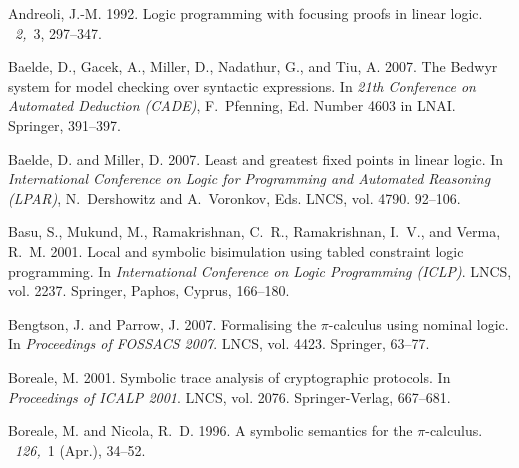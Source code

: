 \documentclass{acmtrans2m}
\begin{document}
\begin{thebibliography}{}

{\sc Andreoli, J.-M.} 1992.
\newblock Logic programming with focusing proofs in linear logic.
~{\em 2,\/}~3, 297--347.

{\sc Baelde, D.}, {\sc Gacek, A.}, {\sc Miller, D.}, {\sc Nadathur, G.}, {\sc
  and} {\sc Tiu, A.} 2007.
\newblock The {Bedwyr} system for model checking over syntactic expressions.
\newblock In {\em 21th Conference on Automated Deduction (CADE)},
  {F.~Pfenning}, Ed. Number 4603 in LNAI. Springer, 391--397.

{\sc Baelde, D.} {\sc and} {\sc Miller, D.} 2007.
\newblock Least and greatest fixed points in linear logic.
\newblock In {\em International Conference on Logic for Programming and
  Automated Reasoning (LPAR)}, {N.~Dershowitz} {and} {A.~Voronkov}, Eds. LNCS,
  vol. 4790. 92--106.

{\sc Basu, S.}, {\sc Mukund, M.}, {\sc Ramakrishnan, C.~R.}, {\sc Ramakrishnan,
  I.~V.}, {\sc and} {\sc Verma, R.~M.} 2001.
\newblock Local and symbolic bisimulation using tabled constraint logic
  programming.
\newblock In {\em International Conference on Logic Programming ({ICLP})}.
  LNCS, vol. 2237. Springer, Paphos, Cyprus, 166--180.

{\sc Bengtson, J.} {\sc and} {\sc Parrow, J.} 2007.
\newblock Formalising the $\pi$-calculus using nominal logic.
\newblock In {\em Proceedings of FOSSACS 2007}. LNCS, vol. 4423. Springer,
  63--77.

{\sc Boreale, M.} 2001.
\newblock Symbolic trace analysis of cryptographic protocols.
\newblock In {\em Proceedings of ICALP 2001}. LNCS, vol. 2076. Springer-Verlag,
  667--681.

{\sc Boreale, M.} {\sc and} {\sc Nicola, R.~D.} 1996.
\newblock A symbolic semantics for the $\pi$-calculus.
~{\em 126,\/}~1 (Apr.), 34--52.


\end{thebibliography}
\end{document}
